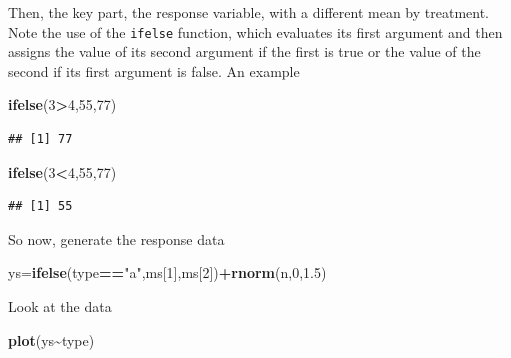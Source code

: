 \documentclass[
]{book}
\newenvironment{Shaded}{\begin{snugshade}}{\end{snugshade}}
\newcommand{\DecValTok}[1]{\textcolor[rgb]{0.00,0.00,0.81}{#1}}
\newcommand{\FloatTok}[1]{\textcolor[rgb]{0.00,0.00,0.81}{#1}}
\newcommand{\FunctionTok}[1]{\textcolor[rgb]{0.13,0.29,0.53}{\textbf{#1}}}
\newcommand{\NormalTok}[1]{#1}
\newcommand{\OtherTok}[1]{\textcolor[rgb]{0.56,0.35,0.01}{#1}}
\newcommand{\SpecialCharTok}[1]{\textcolor[rgb]{0.81,0.36,0.00}{\textbf{#1}}}
\newcommand{\StringTok}[1]{\textcolor[rgb]{0.31,0.60,0.02}{#1}}
\begin{document}
Then, the key part, the response variable, with a different mean by treatment. Note the use of the \texttt{ifelse} function, which evaluates its first argument and then assigns the value of its second argument if the first is true or the value of the second if its first argument is false. An example

\begin{Shaded}
\begin{Highlighting}[]
\FunctionTok{ifelse}\NormalTok{(}\DecValTok{3}\SpecialCharTok{\textgreater{}}\DecValTok{4}\NormalTok{,}\DecValTok{55}\NormalTok{,}\DecValTok{77}\NormalTok{)}
\end{Highlighting}
\end{Shaded}

\begin{verbatim}
## [1] 77
\end{verbatim}

\begin{Shaded}
\begin{Highlighting}[]
\FunctionTok{ifelse}\NormalTok{(}\DecValTok{3}\SpecialCharTok{\textless{}}\DecValTok{4}\NormalTok{,}\DecValTok{55}\NormalTok{,}\DecValTok{77}\NormalTok{)}
\end{Highlighting}
\end{Shaded}

\begin{verbatim}
## [1] 55
\end{verbatim}

So now, generate the response data

\begin{Shaded}
\begin{Highlighting}[]
\NormalTok{ys}\OtherTok{=}\FunctionTok{ifelse}\NormalTok{(type}\SpecialCharTok{==}\StringTok{"a"}\NormalTok{,ms[}\DecValTok{1}\NormalTok{],ms[}\DecValTok{2}\NormalTok{])}\SpecialCharTok{+}\FunctionTok{rnorm}\NormalTok{(n,}\DecValTok{0}\NormalTok{,}\FloatTok{1.5}\NormalTok{)}
\end{Highlighting}
\end{Shaded}

Look at the data

\begin{Shaded}
\begin{Highlighting}[]
\FunctionTok{plot}\NormalTok{(ys}\SpecialCharTok{\textasciitilde{}}\NormalTok{type)}
\end{Highlighting}
\end{Shaded}
\end{document}
